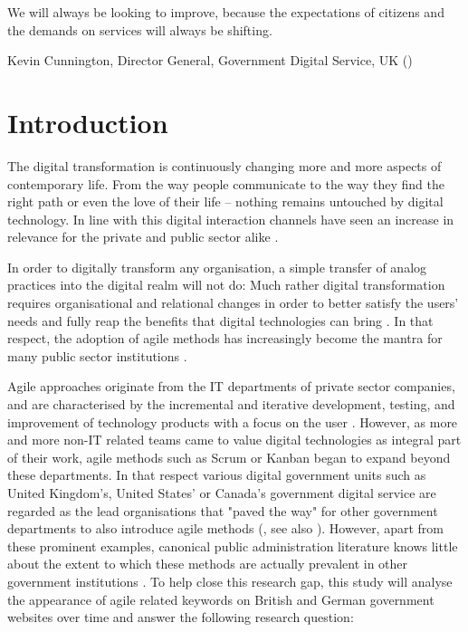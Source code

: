 
\setlength{\epigraphwidth}{0.5\textwidth}
\epigraph{We will always be looking to improve, because the expectations of citizens and the demands on services will always be shifting.}{Kevin Cunnington, Director General, Government Digital Service, UK (\cite*{Cunnington2017})}

\section{Introduction}
\label{Introduction}
The digital transformation is continuously changing more and more aspects of contemporary life. From the way people communicate to the way they find the right path or even the love of their life – nothing remains untouched by digital technology. In line with this digital interaction channels have seen an increase in relevance for the private and public sector alike \parencite{Koeze2020, WorldEconomicForum2020}.

In order to digitally transform any organisation, a simple transfer of analog practices into the digital realm will not do: Much rather digital transformation requires organisational and relational changes in order to better satisfy the users' needs and fully reap the benefits that digital technologies can bring \parencite{Mergel2019a}. In that respect, the adoption of agile methods has increasingly become the mantra for many public sector institutions \parencite{Lundqvist2016, Vacari2015, Mergel}.

Agile approaches originate from the IT departments of private sector companies, and are characterised by the incremental and iterative development, testing, and improvement of technology products with a focus on the user \parencite{Mergel2016}. However, as more and more non-IT related teams came to value digital technologies as integral part of their work, agile methods such as Scrum or Kanban began to expand beyond these departments. In that respect various digital government units such as United Kingdom's, United States' or Canada's government digital service are regarded as the lead organisations that "paved the way" for other government departments to also introduce agile methods (\cite[2]{Mergel}, see also \cite{Clarke2019}). However, apart from these prominent examples, canonical public administration literature knows little about the extent to which these methods are actually prevalent in other government institutions \parencite{CarvalhoFernandes2016, Vacari2015, Mergel2018, Mergel}. To help close this research gap, this study will analyse the appearance of agile related keywords on British and German government websites over time and answer the following research question:

